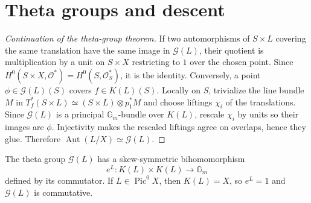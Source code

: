 
\section{Theta groups and descent}
\label{mumford-IV23-continuation-source}

\begin{proof}[Continuation of the theta-group theorem]
\label{mumford-proof-line-bundle-theta-group-continuation}
If two automorphisms of $S\times L$ covering the same translation have the
same image in $\mathcal G(L)$, their quotient is multiplication by a unit on
$S\times X$ restricting to $1$ over the chosen point. Since
$H^0(S\times X,\mathcal O^*)=H^0(S,\mathcal O_S^*)$, it is the identity.
Conversely, a point $\phi\in\mathcal G(L)(S)$ covers $f\in K(L)(S)$.
Locally on $S$, trivialize the line bundle $M$ in
$T_f^*(S\times L)\simeq(S\times L)\otimes p_1^*M$ and choose liftings
$\chi_i$ of the translations. Since $\mathcal G(L)$ is a principal
$\mathbb G_m$-bundle over $K(L)$, rescale $\chi_i$ by units so their images
are $\phi$. Injectivity makes the rescaled liftings agree on overlaps, hence
they glue. Therefore
$\underline{\operatorname{Aut}}(L/X)\simeq\mathcal G(L)$.
\end{proof}

\begin{definition}
\label{mumford-def-line-bundle-commutator}
The theta group $\mathcal G(L)$ has a skew-symmetric bihomomorphism
\[
e^L:K(L)\times K(L)\to\mathbb G_m
\]
defined by its commutator. If $L\in\operatorname{Pic}^0X$, then $K(L)=X$,
so $e^L=1$ and $\mathcal G(L)$ is commutative.
\end{definition}

